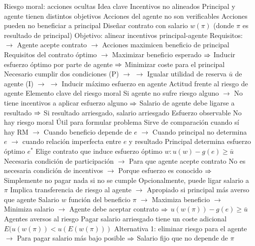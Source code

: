 \documentclass{nuevotema}
\begin{document}
\begin{esquemal}
		\2 Riesgo moral: acciones ocultas
			\3 Idea clave
				\4 Incentivos no alineados
				\4[] Principal y agente tienen distintos objetivos
				\4 Acciones del agente no son verificables
				\4[$\Rightarrow$] Acciones pueden no beneficiar a principal
				\4 Diseñar contrato con salario $w(\pi)$
				\4[] (donde $\pi$ es resultado de principal)
				\4[] Objetivo: alinear incentivos principal-agente
				\4[] Requisitos:
				\4[] $\to$ Agente acepte contrato
				\4[] $\to$ Acciones maximicen beneficio de principal
				\4 Requisitos del contrato óptimo
				\4[] $\to$ Maximizar beneficio esperado
				\4[] $\then$ Inducir esfuerzo óptimo por parte de agente
				\4[] $\then$ Minimizar coste para el principal
				\4[$\then$] Necesario cumplir dos condiciones
				\4[] (P) $\to$ 
				\4[] $\to$ Igualar utilidad de reserva $\bar{u}$ de agente
				\4[] (I) $\to$ 
				\4[] $\to$ Inducir máximo esfuerzo en agente
				\4 Actitud frente al riesgo de agente
				\4[] Elemento clave del riesgo moral
				\4[] Si agente no sufre riesgo alguno
				\4[] $\to$ No tiene incentivos a aplicar esfuerzo alguno
				\4[] $\then$ Salario de agente debe ligarse a resultado
				\4[] $\then$ Si resultado arriesgado, salario arriesgado
			\3 Esfuerzo observable
				\4 No hay riesgo moral
				\4[] Útil para formular problema
				\4[] Sirve de comparación cuando sí hay RM
				\4[] $\to$ Cuando beneficio depende de $e$
				\4[] $\to$ Cuando principal no determina $e$
				\4[] $\to$ cuando relación imperfecta entre $e$ y resultado
				\4 Principal determina esfuerzo óptimo $e^*$
				\4 Elige contrato que induce esfuerzo óptimo
				\4[] $w : u(w) -g(e) \ge \bar{u}$
				\4[] Necesaria condición de participación
				\4[] $\to$ Para que agente acepte contrato
				\4[] No es necesaria condición de incentivos
				\4[] $\to$ Porque esfuerzo es conocido
				\4[] $\then$ Simplemente no pagar nada si no se cumple
				\4 Opcionalmente, puede ligar salario a $\pi$
				\4[] Implica transferencia de riesgo al agente
				\4[] $\to$ Apropiado si principal más averso que agente
				\4[] Salario $w$ función del beneficio $\pi$
				\4[] $\to$ Maximiza beneficio $\to$ Minimiza salario
				\4[] $\to$ Agente debe aceptar contrato
				\4[] $\then$ $u(w(\pi)) - g(e) \ge \bar{u}$
				\4 Agentes aversos al riesgo
				\4[] Pagar salario arriesgado tiene un coste adicional
				\4[] $E(u(w(\pi)) < u(E(w(\pi)))$
				\4[] Alternativa 1: eliminar riesgo para el agente
				\4[] $\to$ Para pagar salario más bajo posible
				\4[] $\then$ Salario fijo que no depende de $\pi$

\end{esquemal}
\end{document}
